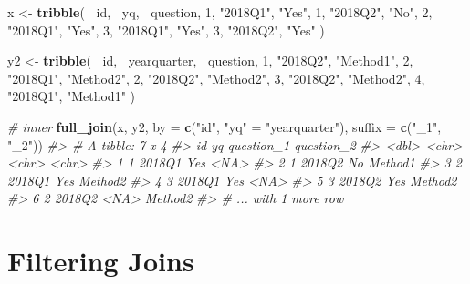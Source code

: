 \documentclass[]{book}
\newenvironment{Shaded}{\begin{snugshade}}{\end{snugshade}}
\newcommand{\CommentTok}[1]{\textcolor[rgb]{0.56,0.35,0.01}{\textit{#1}}}
\newcommand{\DataTypeTok}[1]{\textcolor[rgb]{0.13,0.29,0.53}{#1}}
\newcommand{\DecValTok}[1]{\textcolor[rgb]{0.00,0.00,0.81}{#1}}
\newcommand{\KeywordTok}[1]{\textcolor[rgb]{0.13,0.29,0.53}{\textbf{#1}}}
\newcommand{\NormalTok}[1]{#1}
\newcommand{\OperatorTok}[1]{\textcolor[rgb]{0.81,0.36,0.00}{\textbf{#1}}}
\newcommand{\StringTok}[1]{\textcolor[rgb]{0.31,0.60,0.02}{#1}}
\theoremstyle{definition}
\theoremstyle{definition}
\theoremstyle{definition}
\theoremstyle{remark}
\begin{document}
\begin{Shaded}
\begin{Highlighting}[]
\NormalTok{x <-}\StringTok{ }\KeywordTok{tribble}\NormalTok{(}
  \OperatorTok{~}\NormalTok{id, }\OperatorTok{~}\NormalTok{yq, }\OperatorTok{~}\NormalTok{question,}
     \DecValTok{1}\NormalTok{, }\StringTok{"2018Q1"}\NormalTok{, }\StringTok{"Yes"}\NormalTok{,}
     \DecValTok{1}\NormalTok{, }\StringTok{"2018Q2"}\NormalTok{, }\StringTok{"No"}\NormalTok{,}
     \DecValTok{2}\NormalTok{, }\StringTok{"2018Q1"}\NormalTok{, }\StringTok{"Yes"}\NormalTok{,}
     \DecValTok{3}\NormalTok{, }\StringTok{"2018Q1"}\NormalTok{, }\StringTok{"Yes"}\NormalTok{,}
     \DecValTok{3}\NormalTok{, }\StringTok{"2018Q2"}\NormalTok{, }\StringTok{"Yes"}
\NormalTok{)}

\NormalTok{y2 <-}\StringTok{ }\KeywordTok{tribble}\NormalTok{(}
  \OperatorTok{~}\NormalTok{id, }\OperatorTok{~}\NormalTok{yearquarter, }\OperatorTok{~}\NormalTok{question,}
     \DecValTok{1}\NormalTok{, }\StringTok{"2018Q2"}\NormalTok{, }\StringTok{"Method1"}\NormalTok{,}
     \DecValTok{2}\NormalTok{, }\StringTok{"2018Q1"}\NormalTok{, }\StringTok{"Method2"}\NormalTok{,}
     \DecValTok{2}\NormalTok{, }\StringTok{"2018Q2"}\NormalTok{, }\StringTok{"Method2"}\NormalTok{,}
     \DecValTok{3}\NormalTok{, }\StringTok{"2018Q2"}\NormalTok{, }\StringTok{"Method2"}\NormalTok{,}
     \DecValTok{4}\NormalTok{, }\StringTok{"2018Q1"}\NormalTok{, }\StringTok{"Method1"}
\NormalTok{)}

\CommentTok{# inner}
\KeywordTok{full_join}\NormalTok{(x, y2, }\DataTypeTok{by =} \KeywordTok{c}\NormalTok{(}\StringTok{"id"}\NormalTok{, }\StringTok{"yq"}\NormalTok{ =}\StringTok{ "yearquarter"}\NormalTok{), }\DataTypeTok{suffix =} \KeywordTok{c}\NormalTok{(}\StringTok{"_1"}\NormalTok{, }\StringTok{"_2"}\NormalTok{))}
\CommentTok{#> # A tibble: 7 x 4}
\CommentTok{#>      id yq     question_1 question_2}
\CommentTok{#>   <dbl> <chr>  <chr>      <chr>     }
\CommentTok{#> 1     1 2018Q1 Yes        <NA>      }
\CommentTok{#> 2     1 2018Q2 No         Method1   }
\CommentTok{#> 3     2 2018Q1 Yes        Method2   }
\CommentTok{#> 4     3 2018Q1 Yes        <NA>      }
\CommentTok{#> 5     3 2018Q2 Yes        Method2   }
\CommentTok{#> 6     2 2018Q2 <NA>       Method2   }
\CommentTok{#> # ... with 1 more row}
\end{Highlighting}
\end{Shaded}

\hypertarget{filtering-joins}{%
\section{Filtering Joins}\label{filtering-joins}}
\end{document}
